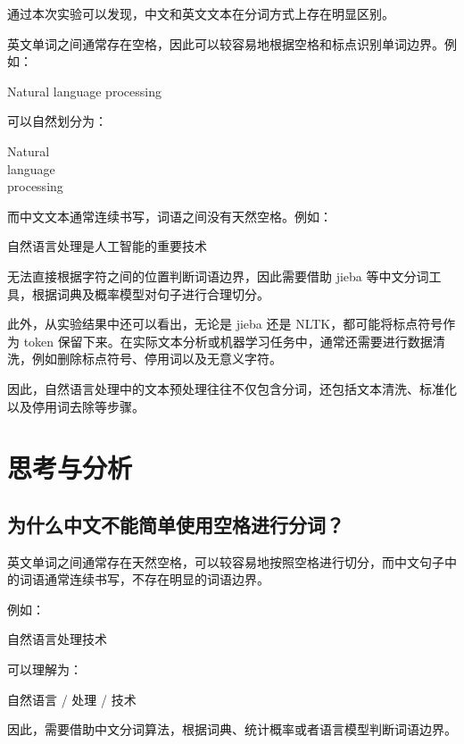 \documentclass[fontset=none,zihao=-4,a4paper]{ctexart}
\begin{document}
	通过本次实验可以发现，中文和英文文本在分词方式上存在明显区别。
	
	英文单词之间通常存在空格，因此可以较容易地根据空格和标点识别单词边界。例如：
	
	\par\noindent Natural language processing\par
	
	可以自然划分为：
	
	\par\noindent Natural\\
language\\
processing\par
	
	而中文文本通常连续书写，词语之间没有天然空格。例如：
	
	\par\noindent 自然语言处理是人工智能的重要技术\par
	无法直接根据字符之间的位置判断词语边界，因此需要借助 jieba 等中文分词工具，根据词典及概率模型对句子进行合理切分。
	
	此外，从实验结果中还可以看出，无论是 jieba 还是 NLTK，都可能将标点符号作为 token 保留下来。在实际文本分析或机器学习任务中，通常还需要进行数据清洗，例如删除标点符号、停用词以及无意义字符。
	
	因此，自然语言处理中的文本预处理往往不仅包含分词，还包括文本清洗、标准化以及停用词去除等步骤。
	
	\section{思考与分析}
	
	\subsection{为什么中文不能简单使用空格进行分词？}
	
	英文单词之间通常存在天然空格，可以较容易地按照空格进行切分，而中文句子中的词语通常连续书写，不存在明显的词语边界。
	
	例如：
	
	\par\noindent 自然语言处理技术\par
	
	可以理解为：
	
	\par\noindent 自然语言 / 处理 / 技术\par
	
	因此，需要借助中文分词算法，根据词典、统计概率或者语言模型判断词语边界。
	
\end{document}
